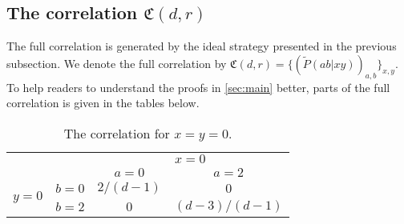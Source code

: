 \documentclass[11pt,letterpaper]{article}
\newcommand{\1}{\mathbb{1}}
\newcommand{\fC}{\mathfrak{C}}
\newcommand{\tpr}[2]{\tilde{P}(#1|#2)}
\theoremstyle{definition}
\begin{document}
\subsection{The correlation $\fC(d,r)$}
\label{sec:cor}
The full correlation is generated by the ideal strategy presented in the previous subsection.
We denote the full correlation by $\fC(d,r) = \{( \tpr{ab}{xy} )_{a,b}\}_{x,y}$.
To help readers to understand the proofs in \cref{sec:main} better, 
parts of the full correlation is given in the tables below.
\begin{table}[H]
\begin{center}
\begin{tabular}{|c|c||c|c|}
\hline
\multicolumn{2}{|c|}{} &
\multicolumn{2}{|c|}{$x=0$}\\
\cline{3-4}
\multicolumn{2}{|c|}{} &$a = 0$ & $a = 2$ \\
\hline
\hline
\multirow{2}{*}{$y = 0$} & $b = 0$ & $2/(d-1)$ & $0$ \\
\cline{2-4}
&$b=2$ & $0$ & $(d-3)/(d-1)$ \\
\hline
\end{tabular}
\caption{The correlation for $x=y=0$.}
\end{center}
\end{table}
\end{document}
